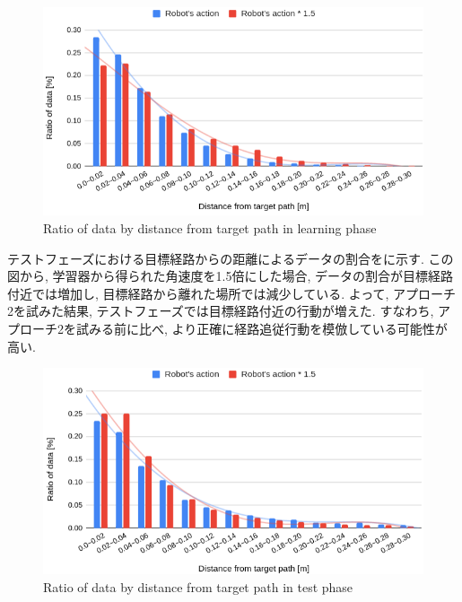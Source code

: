   \begin{figure}[hbtp]
    \centering
   \includegraphics[keepaspectratio, scale=0.37]
        {images/hist_act_training2.png}
   \caption{Ratio of data by distance from target path in learning phase}
   \label{Fig:hist_act_training}
  \end{figure}  


  テストフェーズにおける目標経路からの距離によるデータの割合をに示す. この図から, 学習器から得られた角速度を1.5倍にした場合, データの割合が目標経路付近では増加し, 目標経路から離れた場所では減少している. よって, アプローチ2を試みた結果, テストフェーズでは目標経路付近の行動が増えた. すなわち, アプローチ2を試みる前に比べ, より正確に経路追従行動を模倣している可能性が高い.

  \begin{figure}[hbtp]
    \centering
   \includegraphics[keepaspectratio, scale=0.37]
        {images/hist_act_test2.png}
   \caption{Ratio of data by distance from target path in test phase}
   \label{Fig:hist_act_test}
  \end{figure}  

